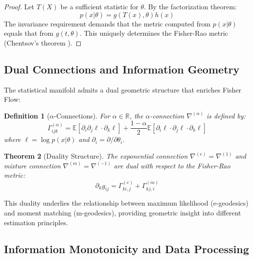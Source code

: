 \documentclass[11pt]{article}
\newtheorem{theorem}{Theorem}
\newtheorem{definition}[theorem]{Definition}
\begin{document}
\begin{proof}
Let $T(X)$ be a sufficient statistic for $\theta$. By the factorization theorem:
\begin{equation}
p(x|\theta) = g(T(x), \theta)h(x)
\end{equation}
The invariance requirement demands that the metric computed from $p(x|\theta)$ equals that from $g(t, \theta)$. This uniquely determines the Fisher-Rao metric (Chentsov's theorem \cite{chentsov1982statistical}).
\end{proof}

\subsection{Dual Connections and Information Geometry}

The statistical manifold admits a dual geometric structure that enriches Fisher Flow:

\begin{definition}[$\alpha$-Connections]
For $\alpha \in \mathbb{R}$, the $\alpha$-connection $\nabla^{(\alpha)}$ is defined by:
\begin{equation}
\Gamma_{ijk}^{(\alpha)} = \mathbb{E}\left[\partial_i \partial_j \ell \cdot \partial_k \ell\right] + \frac{1-\alpha}{2}\mathbb{E}\left[\partial_i \ell \cdot \partial_j \ell \cdot \partial_k \ell\right]
\end{equation}
where $\ell = \log p(x|\theta)$ and $\partial_i = \partial/\partial\theta_i$.
\end{definition}

\begin{theorem}[Duality Structure]
The exponential connection $\nabla^{(e)} = \nabla^{(1)}$ and mixture connection $\nabla^{(m)} = \nabla^{(-1)}$ are dual with respect to the Fisher-Rao metric:
\begin{equation}
\partial_k g_{ij} = \Gamma_{ki,j}^{(e)} + \Gamma_{kj,i}^{(m)}
\end{equation}
\end{theorem}

This duality underlies the relationship between maximum likelihood (e-geodesics) and moment matching (m-geodesics), providing geometric insight into different estimation principles.

\subsection{Information Monotonicity and Data Processing}
\end{document}
